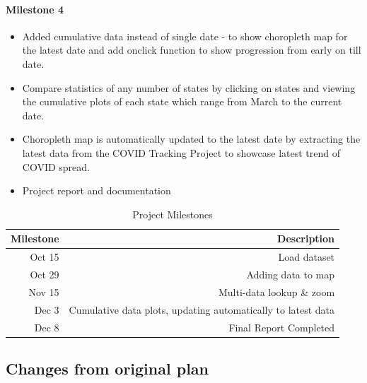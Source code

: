 \paragraph{Milestone 4}
\begin{itemize}
\item Added cumulative data instead of single date - to show choropleth map for the latest date and add onclick function to show progression from early on till date.
\item Compare statistics of any number of states by clicking on states and viewing the cumulative plots of each state which range from March to the current date.
\item Choropleth map is automatically updated to the latest date by extracting the latest data from the COVID Tracking Project to showcase latest trend of COVID spread.
\item Project report and documentation
\end{itemize}

\begin{table}[h]
 \caption{Project Milestones}\vspace{1ex} %
 \label{tab:milestones}
 \scriptsize
 \centering %
   \begin{tabular}{r|r}
     Milestone & Description\\
   \hline
     Oct 15 & Load dataset  \\
     Oct 29 & Adding data to map \\
Nov 15     &  Multi-data lookup \& zoom \\
Dec 3 & Cumulative data plots, updating automatically to latest data \\
Dec 8 & Final Report Completed \\
   \end{tabular}
\end{table}

\subsection{Changes from original plan}
\label{sec:changes}

